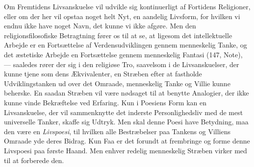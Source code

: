 \documentclass[12pt,a4paper]{book}
\begin{document}
Om Fremtidens Livsanskuelse vil udvikle sig kontinuerligt af Fortidens Religioner, eller om
der her vil opstaa noget helt Nyt, en aandelig Livsform, for hvilken vi endnu ikke have noget
Navn, det kunne vi ikke afgøre. Men den religionsfilosofiske Betragtning fører os til at se,
at ligesom det intellektuelle Arbejde er en Fortsættelse af Verdensudviklingen gennem
menneskelig Tanke, og det æstetiske Arbejde en Fortsættelse gennem menneskelig Fantasi (147,
Note), --- saaledes rører der sig i den religiøse Tro, saavelsom i de Livsanskuelser, der
kunne tjene som dens Ækvivalenter, en Stræben efter at fastholde Udviklingstanken ud over det
Omraade, menneskelig Tanke og Villie kunne beherske. En saadan Stræben vil være nødsaget til
at benytte Analogier, der ikke kunne vinde Bekræftelse ved Erfaring. Kun i Poesiens Form kan
en Livsanskuelse, der vil sammenknytte det inderste Personlighedsliv med de mest universelle
Tanker, skaffe sig Udtryk. Men skal denne Poesi have Betydning, maa den være en
\emph{Livspoesi}, til hvilken alle Bestræbelser paa Tankens og Villiens Omraade yde deres
Bidrag. Kun Faa er det forundt at frembringe og forme denne Livspoesi paa første Haand. Men
enhver redelig menneskelig Stræben virker med til at forberede den.
\end{document}
